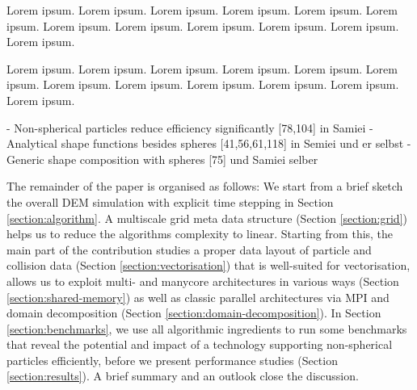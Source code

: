 Lorem ipsum. Lorem ipsum. Lorem ipsum. Lorem ipsum. Lorem ipsum. Lorem ipsum.
Lorem ipsum. Lorem ipsum. Lorem ipsum. Lorem ipsum. Lorem ipsum. Lorem ipsum. 

Lorem ipsum. Lorem ipsum. Lorem ipsum. Lorem ipsum. Lorem ipsum. Lorem ipsum.
Lorem ipsum. Lorem ipsum. Lorem ipsum. Lorem ipsum. Lorem ipsum. Lorem ipsum. 


- Non-spherical particles reduce efficiency significantly [78,104] in Samiei
- Analytical shape functions besides spheres [41,56,61,118] in Semiei und er
selbst
- Generic shape composition with spheres [75] und Samiei selber


The remainder of the paper is organised as follows: 
We start from a brief sketch the overall DEM simulation with
explicit time stepping in Section \ref{section:algorithm}. 
A multiscale grid meta data structure (Section \ref{section:grid}) helps us to
reduce the algorithms complexity to linear.
Starting from this, the main part of the contribution studies a proper data
layout of particle and collision data (Section \ref{section:vectorisation}) that is well-suited for
vectorisation, allows us to exploit multi- and manycore
architectures in various ways (Section \ref{section:shared-memory}) as well as
classic parallel architectures via MPI and domain decomposition (Section
\ref{section:domain-decomposition}).
In Section \ref{section:benchmarks}, we use all algorithmic ingredients to run some benchmarks
that reveal the potential and impact of a technology supporting non-spherical
particles efficiently, before we present performance studies (Section
\ref{section:results}).
A brief summary and an outlook close the discussion.
